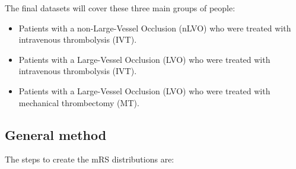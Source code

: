The final datasets will cover these three main groups of people:

\begin{itemize}
    \item Patients with a non-Large-Vessel Occlusion (nLVO) who were treated with intravenous thrombolysis (IVT).
    \item Patients with a Large-Vessel Occlusion (LVO) who were treated with intravenous thrombolysis (IVT).
    \item Patients with a Large-Vessel Occlusion (LVO) who were treated with mechanical thrombectomy (MT).
\end{itemize}

\subsection{General method}

The steps to create the mRS distributions are:


